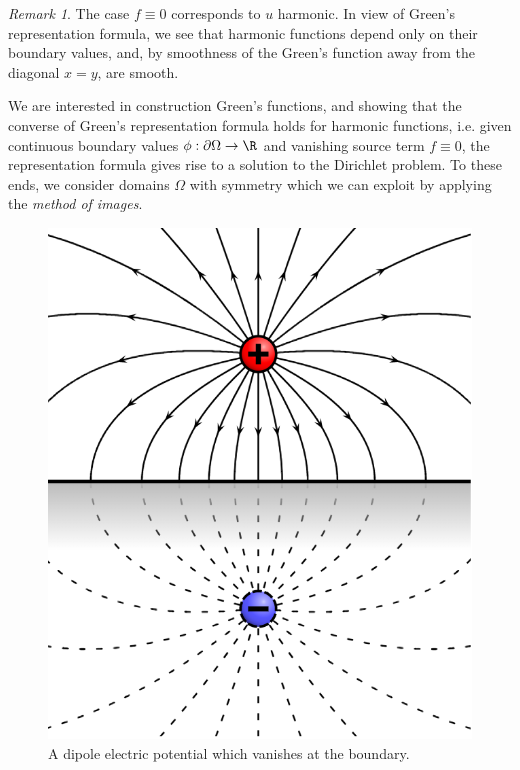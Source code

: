 \documentclass[reqno]{amsart}
\theoremstyle{definition}
\theoremstyle{remark}
\newtheorem*{remark}{Remark}
\newcounter{problem}[section]	\declaretheorem[style=thmrecbox,name=Problem, numberlike=problem]{statement}
\begin{document}
\begin{remark}
	The case $f \equiv 0$ corresponds to $u$ harmonic. In view of Green's representation formula, we see that harmonic functions depend only on their boundary values, and, by smoothness of the Green's function away from the diagonal $x = y$, are smooth. 
\end{remark}

We are interested in construction Green's functions, and showing that the converse of Green's representation formula holds for harmonic functions, i.e. given continuous boundary values $\phi : \partial \Omega \to \R$ and vanishing source term $f \equiv 0$, the representation formula gives rise to a solution to the Dirichlet problem. To these ends, we consider domains $\Omega$ with symmetry which we can exploit by applying the \textit{method of images}. 
\begin{figure}[h]
	\begin{center}
		\includegraphics[scale = 0.3]{reflection}
		\caption{A dipole electric potential which vanishes at the boundary.}
	\end{center}
\end{figure}
\end{document}
